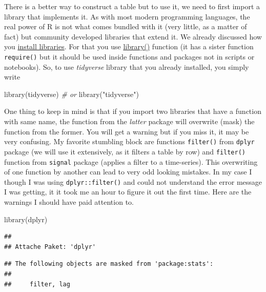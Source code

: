 \documentclass[
]{book}
\newenvironment{Shaded}{\begin{snugshade}}{\end{snugshade}}
\newcommand{\CommentTok}[1]{\textcolor[rgb]{0.56,0.35,0.01}{\textit{#1}}}
\newcommand{\FunctionTok}[1]{\textcolor[rgb]{0.00,0.00,0.00}{#1}}
\newcommand{\NormalTok}[1]{#1}
\newcommand{\StringTok}[1]{\textcolor[rgb]{0.31,0.60,0.02}{#1}}
\begin{document}
There is a better way to construct a table but to use it, we need to first import a library that implements it. As with most modern programming languages, the real power of R is not what comes bundled with it (very little, as a matter of fact) but community developed libraries that extend it. We already discussed how you \protect\hyperlink{install.packages}{install libraries}. For that you use \href{https://www.rdocumentation.org/packages/base/versions/3.6.2/topics/library}{library()} function (it has a sister function \texttt{require()} but it should be used inside functions and packages not in scripts or notebooks). So, to use \emph{tidyverse} library that you already installed, you simply write

\begin{Shaded}
\begin{Highlighting}[]
\FunctionTok{library}\NormalTok{(tidyverse)}
\CommentTok{\# or}
\FunctionTok{library}\NormalTok{(}\StringTok{"tidyverse"}\NormalTok{)}
\end{Highlighting}
\end{Shaded}

One thing to keep in mind is that if you import two libraries that have a function with same name, the function from the \emph{latter} package will overwrite (mask) the function from the former. You will get a warning but if you miss it, it may be very confusing. My favorite stumbling block are functions \texttt{filter()} from \texttt{dplyr} package (we will use it extensively, as it filters a table by row) and \texttt{filter()} function from \texttt{signal} package (applies a filter to a time-series). This overwriting of one function by another can lead to very odd looking mistakes. In my case I though I was using \texttt{dplyr::filter()} and could not understand the error message I was getting, it it took me an hour to figure it out the first time. Here are the warnings I should have paid attention to.

\begin{Shaded}
\begin{Highlighting}[]
\FunctionTok{library}\NormalTok{(dplyr)}
\end{Highlighting}
\end{Shaded}

\begin{verbatim}
## 
## Attache Paket: 'dplyr'
\end{verbatim}

\begin{verbatim}
## The following objects are masked from 'package:stats':
## 
##     filter, lag
\end{verbatim}
\end{document}
